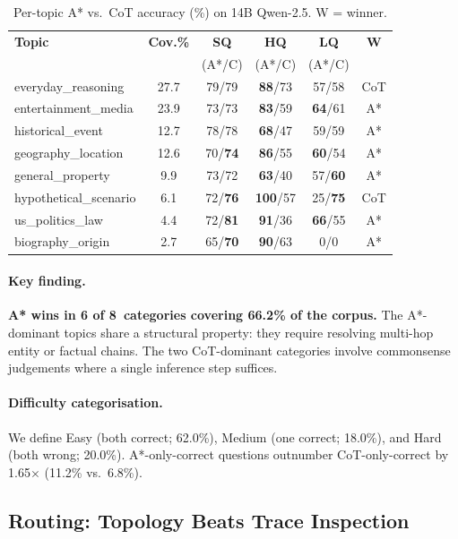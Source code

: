 \documentclass[11pt]{article}
\begin{document}
\begin{table}[t]
\centering
\caption{Per-topic A* vs.\ CoT accuracy (\%) on 14B Qwen-2.5.  W = winner.}
\label{tab:topic}
\small
\setlength{\tabcolsep}{3pt}
\begin{tabular}{@{}lc ccc c@{}}
\toprule
\textbf{Topic} & \textbf{Cov.\%} & \textbf{SQ} & \textbf{HQ}
  & \textbf{LQ} & \textbf{W} \\
& & (A*/C) & (A*/C) & (A*/C) & \\
\midrule
everyday\_reasoning      & 27.7 & 79/79 & \textbf{88}/73 & 57/58 & CoT \\
entertainment\_media     & 23.9 & 73/73 & \textbf{83}/59 & \textbf{64}/61 & A* \\
historical\_event        & 12.7 & 78/78 & \textbf{68}/47 & 59/59 & A* \\
geography\_location      & 12.6 & 70/\textbf{74} & \textbf{86}/55 & \textbf{60}/54 & A* \\
general\_property        &  9.9 & 73/72 & \textbf{63}/40 & 57/\textbf{60} & A* \\
hypothetical\_scenario   &  6.1 & 72/\textbf{76} & \textbf{100}/57 & 25/\textbf{75} & CoT \\
us\_politics\_law        &  4.4 & 72/\textbf{81} & \textbf{91}/36 & \textbf{66}/55 & A* \\
biography\_origin        &  2.7 & 65/\textbf{70} & \textbf{90}/63 & 0/0 & A* \\
\bottomrule
\end{tabular}
\end{table}

\paragraph{Key finding.}
\textbf{A* wins in 6 of 8~categories covering 66.2\% of the corpus.}  The
A*-dominant topics share a structural property: they require resolving
multi-hop entity or factual chains.  The two CoT-dominant categories involve
commonsense judgements where a single inference step suffices.

\paragraph{Difficulty categorisation.}
We define Easy (both correct; 62.0\%), Medium (one correct; 18.0\%), and
Hard (both wrong; 20.0\%).  A*-only-correct questions outnumber
CoT-only-correct by 1.65$\times$ (11.2\% vs.\ 6.8\%).

\subsection{Routing: Topology Beats Trace Inspection}
\label{sec:routing}
\end{document}
